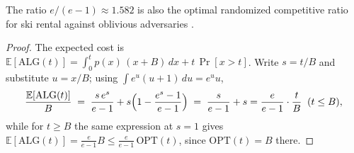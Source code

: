The ratio $e/(e-1) \approx 1.582$ is also the optimal randomized competitive ratio
for ski rental against oblivious adversaries \citep{online-decisions-bg2}.

\begin{proof}
The expected cost is $\mathbb{E}[\mathrm{ALG}(t)] = \int_0^t p(x)\,(x + B)\,dx + t\,
\Pr[x > t]$. Write $s = t/B$ and substitute $u = x/B$; using
$\int e^u (u+1)\,du = e^u u$,
\[
\frac{\mathbb{E}[\mathrm{ALG}(t)]}{B}
\;=\; \frac{s\,e^{s}}{e-1} + s\Bigl(1 - \frac{e^{s}-1}{e-1}\Bigr)
\;=\; \frac{s}{e-1} + s = \frac{e}{e-1}\cdot\frac{t}{B} \;\; (t \le B),
\]
while for $t \ge B$ the same expression at $s = 1$ gives
$\mathbb{E}[\mathrm{ALG}(t)] = \frac{e}{e-1}B \le \frac{e}{e-1}\,\mathrm{OPT}(t)$,
since $\mathrm{OPT}(t) = B$ there.
\end{proof}

\begin{widefigure}[t]
\pgfplotsset{compat=1.15}
\caption{Ski rental geometry (prices in units of $B$): every algorithm tracks OPT while
renting and flattens when it buys. The deterministic threshold at $B$ flattens at $2B$;
the randomized buy time flattens, in expectation, at $\frac{e}{e-1}B$ --- the whole game
is where to place the elbow.}
\label{fig:onl-ski}
\end{widefigure}


